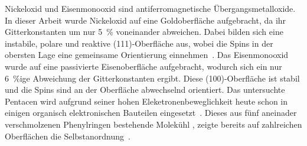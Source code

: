     Nickeloxid und Eisenmonooxid sind antiferromagnetische Übergangsmetalloxide.
    In dieser Arbeit wurde Nickeloxid auf eine Goldoberfläche aufgebracht, da ihr Gitterkonstanten um nur \SI{5}{\percent} voneinander abweichen.
    Dabei bilden sich eine instabile, polare und reaktive (111)-Oberfläche aus, wobei die Spins in der obersten Lage eine gemeinsame Orientierung einnehmen~\cite{cappus_hydroxyl_1993}.
    Das Eisenmonooxid wurde auf eine passivierte Eisenoberfläche aufgebracht, wodurch sich ein nur \SI{6}{\percent}ige Abweichung der Gitterkonstanten ergibt.
    Diese (100)-Oberfläche ist stabil und die Spins sind an der Oberfläche abwechselnd orientiert.
    Das untersuchte Pentacen wird aufgrund seiner hohen Eleketronenbeweglichkeit heute schon in einigen organisch elektronischen Bauteilen eingesetzt~\cite{5A_4, 5A_13}.
    Dieses aus fünf aneinader verschmolzenen Phenylringen bestehende Molekühl \cite{MM_2}, zeigte bereits auf zahlreichen Oberflächen die Selbstanordnung~\cite{5A_4, 5A_1, 5A_6, 5A_10, 5A_5, 5A_9}.
    


